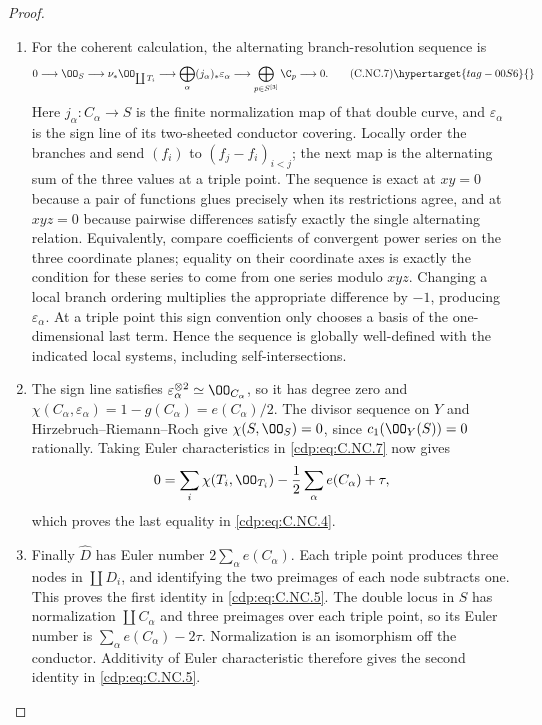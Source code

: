 \begin{proof}
\begin{enumerate}[label={$\langle1\rangle$\arabic*.},leftmargin=*]
\item For the coherent calculation, the alternating branch-resolution sequence is
\[
 0\longrightarrow\OO_S\longrightarrow\nu_*\OO_{\coprod T_i}
 \longrightarrow\bigoplus_\alpha(j_\alpha)_*\varepsilon_\alpha
 \longrightarrow\bigoplus_{p\in S^{[3]}}\C_p
 \longrightarrow0.
 \tag{C.NC.7}\hypertarget{tag-00S6}{}\label{cdp:eq:C.NC.7}
\]
Here $j_\alpha:C_\alpha\to S$ is the finite normalization map of that double curve, and $\varepsilon_\alpha$ is the sign line of its two-sheeted conductor covering. Locally order the branches and send $(f_i)$ to $(f_j-f_i)_{i<j}$; the next map is the alternating sum of the three values at a triple point. The sequence is exact at $xy=0$ because a pair of functions glues precisely when its restrictions agree, and at $xyz=0$ because pairwise differences satisfy exactly the single alternating relation. Equivalently, compare coefficients of convergent power series on the three coordinate planes; equality on their coordinate axes is exactly the condition for these series to come from one series modulo $xyz$. Changing a local branch ordering multiplies the appropriate difference by $-1$, producing $\varepsilon_\alpha$. At a triple point this sign convention only chooses a basis of the one-dimensional last term. Hence the sequence is globally well-defined with the indicated local systems, including self-intersections.

\item The sign line satisfies $\varepsilon_\alpha^{\otimes2}\simeq\OO_{C_\alpha}$, so it has degree zero and $\chi(C_\alpha,\varepsilon_\alpha)=1-g(C_\alpha)=e(C_\alpha)/2$. The divisor sequence on $Y$ and Hirzebruch--Riemann--Roch give $\chi(S,\OO_S)=0$, since $c_1(\OO_Y(S))=0$ rationally. Taking Euler characteristics in \eqref{cdp:eq:C.NC.7} now gives
\[
 0=\sum_i\chi(T_i,\OO_{T_i})-\frac12\sum_\alpha e(C_\alpha)+\tau,
\]
which proves the last equality in \eqref{cdp:eq:C.NC.4}.

\item Finally $\widehat D$ has Euler number $2\sum_\alpha e(C_\alpha)$. Each triple point produces three nodes in $\coprod D_i$, and identifying the two preimages of each node subtracts one. This proves the first identity in \eqref{cdp:eq:C.NC.5}. The double locus in $S$ has normalization $\coprod C_\alpha$ and three preimages over each triple point, so its Euler number is $\sum_\alpha e(C_\alpha)-2\tau$. Normalization is an isomorphism off the conductor. Additivity of Euler characteristic therefore gives the second identity in \eqref{cdp:eq:C.NC.5}.

\end{enumerate}
\end{proof}